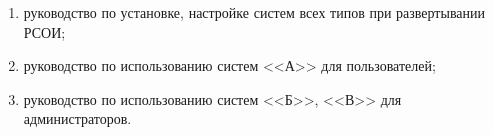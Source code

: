 \begin{enumerate}
	\item руководство по установке, настройке систем всех типов при развертывании РСОИ;
	\item руководство по использованию систем <<А>> для пользователей;
	\item руководство по использованию систем <<Б>>, <<В>> для администраторов.
\end{enumerate}


























